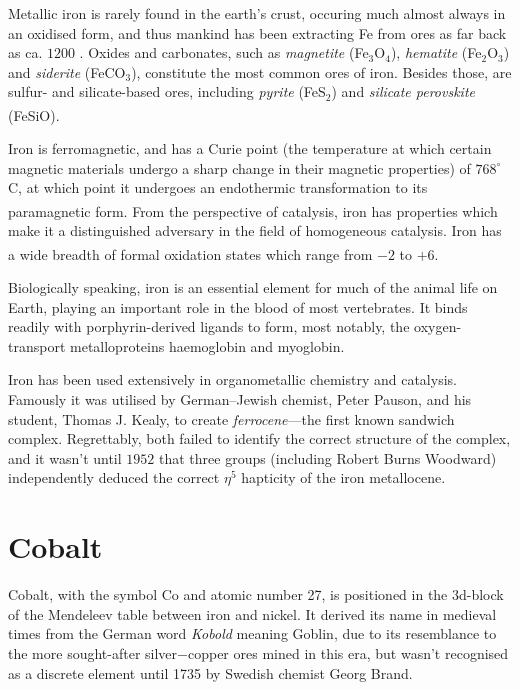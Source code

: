 Metallic iron is rarely found in the earth's crust, occuring much almost always in an oxidised form, and thus mankind has been extracting Fe from ores as far back as ca. $1200$ . Oxides and carbonates, such as \textit{magnetite} (Fe$_3$O$_4$), \textit{hematite} (Fe$_2$O$_3$) and \textit{siderite} (FeCO$_3$), constitute the most common ores of iron. Besides those, are sulfur- and silicate-based ores, including \textit{pyrite} (FeS$_2$) and \textit{silicate perovskite} (FeSiO).\textsuperscript{\cite{nicholls:1973}}

Iron is ferromagnetic, and has a Curie point (the temperature at which certain magnetic materials undergo a sharp change in their magnetic properties) of $768^{\circ}$C, at which point it undergoes an endothermic transformation to its paramagnetic form.\textsuperscript{\cite{nicholls:1973}} From the perspective of catalysis, iron has properties which make it a distinguished adversary in the field of homogeneous catalysis. Iron has a wide breadth of formal oxidation states which range from $-2$ to $+6$.\textsuperscript{\cite{fuerstner:2016}}

Biologically speaking, iron is an essential element for much of the animal life on Earth, playing an important role in the blood of most vertebrates. It binds readily with porphyrin-derived ligands to form, most notably, the oxygen-transport metalloproteins haemoglobin and myoglobin.

Iron has been used extensively in organometallic chemistry and catalysis. Famously it was utilised by German--Jewish chemist, Peter Pauson, and his student, Thomas J. Kealy, to create \textit{ferrocene}---the first known sandwich complex. Regrettably, both failed to identify the correct structure of the complex, and it wasn't until $1952$ that three groups (including Robert Burns Woodward) independently deduced the correct $\eta^{5}$ hapticity of the iron metallocene.

\section{Cobalt}

Cobalt, with the symbol Co and atomic number 27, is positioned in the 3d-block of the Mendeleev table between iron and nickel. It derived its name in medieval times from the German word \textit{Kobold} meaning Goblin, due to its resemblance to the more sought-after silver$-$copper ores mined in this era, but wasn't recognised as a discrete element until 1735 by Swedish chemist Georg Brand.

